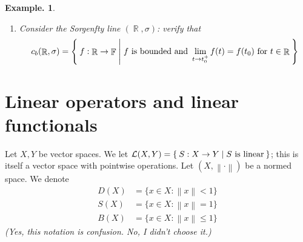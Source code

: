\documentclass[11pt, a4paper]{memoir}
\DeclareMathOperator{\R}{{\mathbb{R}}}
\DeclareMathOperator{\F}{{\mathbb{F}}}
\newcommand{\norm}[1]{\ensuremath{\left\lVert#1\right\rVert}}
\theoremstyle{change}
\theoremstyle{plain}
\theoremstyle{nonumberplain}
\newtheorem{example}{Example.}
\newtheorem{proof}{Proof}
\numberwithin{equation}{section}
\begin{document}
\begin{example}
\begin{enumerate}[nl,r]
\begin{proof}
                Thus $f\in\mathcal{I}(x_0)$, and closed subsets of complete spaces are themselves complete.
            \end{proof}
            Now, $f\mapsto(f(n))_{n=1}^\infty:\mathcal{I}(\infty)\to c_0$ is a (linear) surjective isometry.
        \item Consider the Sorgenfty line $(\R,\sigma)$: verify that
            \begin{equation*}
                c_b(\R,\sigma)=\Set{f:\R\to\F | f\text{ is bounded and }\lim_{t\to t_0^+} f(t)=f(t_0)\text{ for }t\in\R}
            \end{equation*}
    \end{enumerate}
\end{example}
\section{Linear operators and linear functionals}
Let $X,Y$ be vector spaces.
We let $\mathcal{L}(X,Y)=\Set{S:X\to Y | S\text{ is linear}}$; this is itself a vector space with pointwise operations.
Let $(X,\norm{\cdot})$ be a normed space.
We denote
\begin{align*}
    D(X) &= \{x\in X:\norm{x}<1\}\\
    S(X) &= \{x\in X:\norm{x}=1\}\\
    B(X) &= \{x\in X:\norm{x}\leq 1\}
\end{align*}
\textit{(Yes, this notation is confusion. No, I didn't choose it.)}
\end{document}
